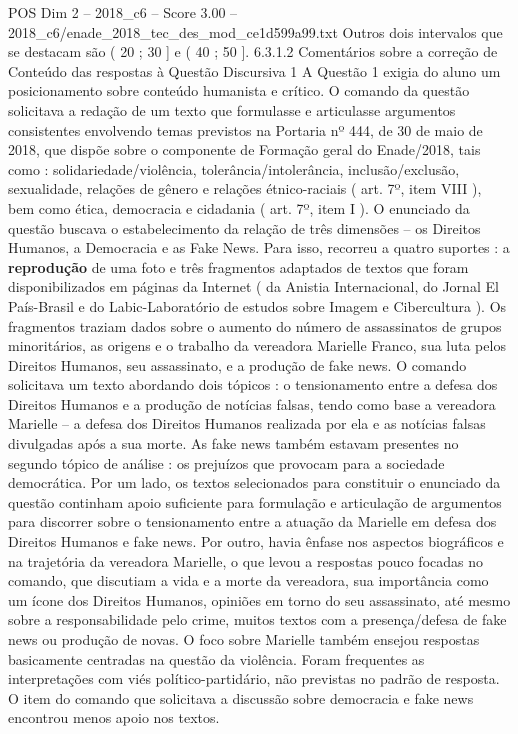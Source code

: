 \begin{textsample}{POS Dim 2 – 2018\_c6 – Score 3.00 – 2018\_c6/enade\_2018\_tec\_des\_mod\_ce1d599a99.txt}
Outros dois intervalos que se destacam são ( 20 ; 30 ] e ( 40 ; 50 ]. 6.3.1.2 Comentários sobre a correção de Conteúdo das respostas à Questão Discursiva 1 A Questão 1 exigia do aluno um posicionamento sobre conteúdo humanista e crítico.
O comando da questão solicitava a redação de um texto que formulasse e articulasse argumentos consistentes envolvendo temas previstos na Portaria nº 444, de 30 de maio de 2018, que dispõe sobre o componente de Formação geral do Enade/2018, tais como : solidariedade/violência, tolerância/intolerância, inclusão/exclusão, sexualidade, relações de gênero e relações étnico-raciais ( art. 7º, item VIII ), bem como ética, democracia e cidadania ( art. 7º, item I ).
O enunciado da questão buscava o estabelecimento da relação de três dimensões – os Direitos Humanos, a Democracia e as Fake News.
Para isso, recorreu a quatro suportes : a \textbf{reprodução} de uma foto e três fragmentos adaptados de textos que foram disponibilizados em páginas da Internet ( da Anistia Internacional, do Jornal El País-Brasil e do Labic-Laboratório de estudos sobre Imagem e Cibercultura ).
Os fragmentos traziam dados sobre o aumento do número de assassinatos de grupos minoritários, as origens e o trabalho da vereadora Marielle Franco, sua luta pelos Direitos Humanos, seu assassinato, e a produção de fake news.
O comando solicitava um texto abordando dois tópicos : o tensionamento entre a defesa dos Direitos Humanos e a produção de notícias falsas, tendo como base a vereadora Marielle – a defesa dos Direitos Humanos realizada por ela e as notícias falsas divulgadas após a sua morte.
As fake news também estavam presentes no segundo tópico de análise : os prejuízos que provocam para a sociedade democrática.
Por um lado, os textos selecionados para constituir o enunciado da questão continham apoio suficiente para formulação e articulação de argumentos para discorrer sobre o tensionamento entre a atuação da Marielle em defesa dos Direitos Humanos e fake news.
Por outro, havia ênfase nos aspectos biográficos e na trajetória da vereadora Marielle, o que levou a respostas pouco focadas no comando, que discutiam a vida e a morte da vereadora, sua importância como um ícone dos Direitos Humanos, opiniões em torno do seu assassinato, até mesmo sobre a responsabilidade pelo crime, muitos textos com a presença/defesa de fake news ou produção de novas.
O foco sobre Marielle também ensejou respostas basicamente centradas na questão da violência.
Foram frequentes as interpretações com viés político-partidário, não previstas no padrão de resposta.
O item do comando que solicitava a discussão sobre democracia e fake news encontrou menos apoio nos textos.

\end{textsample}
